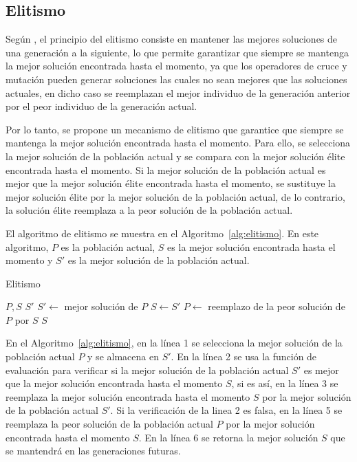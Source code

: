 \subsection{Elitismo}

Según \textcite{Hasni2013}, el principio del elitismo consiste en mantener las mejores soluciones de una generación a la siguiente, lo que permite garantizar que siempre se mantenga la mejor solución encontrada hasta el momento, ya que los operadores de cruce y mutación pueden generar soluciones las cuales no sean mejores que las soluciones actuales, en dicho caso se reemplazan el mejor individuo de la generación anterior por el peor individuo de la generación actual.

Por lo tanto, se propone un mecanismo de elitismo que garantice que siempre se mantenga la mejor solución encontrada hasta el momento. Para ello, se selecciona la mejor solución de la población actual y se compara con la mejor solución élite encontrada hasta el momento. Si la mejor solución de la población actual es mejor que la mejor solución élite encontrada hasta el momento, se sustituye la mejor solución élite por la mejor solución de la población actual, de lo contrario, la solución élite reemplaza a la peor solución de la población actual.

El algoritmo de elitismo se muestra en el Algoritmo~\ref{alg:elitismo}. En este algoritmo, $P$ es la población actual, $S$ es la mejor solución encontrada hasta el momento y $S'$ es la mejor solución de la población actual.

\begin{algorithm}[H]
    \caption{Elitismo}\label{alg:elitismo}
    \begin{algorithmic}[1]
        \Require $P, S$
        \Ensure $S'$
        \State $S' \leftarrow$ mejor solución de $P$
        \State $S \leftarrow S'$
        \Else
        \State $P \leftarrow$ reemplazo de la peor solución de $P$ por $S$
        \EndIf
        \State \Return $S$
    \end{algorithmic}

\end{algorithm}

En el Algoritmo~\ref{alg:elitismo}, en la línea 1 se selecciona la mejor solución de la población actual $P$ y se almacena en $S'$. En la línea 2 se usa la función de evaluación para verificar si la mejor solución de la población actual $S'$ es mejor que la mejor solución encontrada hasta el momento $S$, si es así, en la línea 3 se reemplaza la mejor solución encontrada hasta el momento $S$ por la mejor solución de la población actual $S'$. Si la verificación de la linea 2 es falsa, en la línea 5 se reemplaza la peor solución de la población actual $P$ por la mejor solución encontrada hasta el momento $S$. En la línea 6 se retorna la mejor solución  $S$ que se mantendrá en las generaciones futuras.

